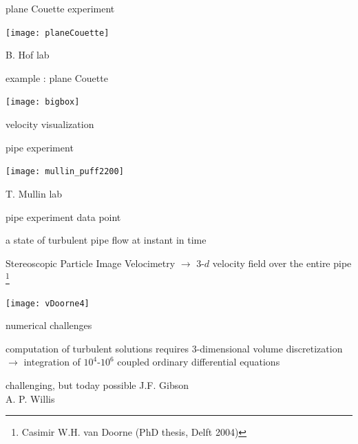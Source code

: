 \begin{frame}{plane Couette experiment}
\begin{center}
\texttt{[image: planeCouette]}
\end{center}
B. Hof lab
\end{frame}

\begin{frame}{example : plane Couette}
\begin{center}
\texttt{[image: bigbox]}
\end{center}
velocity visualization
\end{frame}

\begin{frame}{pipe experiment}
\begin{center}
\texttt{[image: mullin\_puff2200]} %
\end{center}
T. Mullin lab
\end{frame}

\begin{frame}{pipe experiment data point}
\begin{block}{a state of turbulent pipe flow at instant in time}
\end{block}

\bigskip

Stereoscopic Particle Image Velocimetry $\to$
3-$d$ velocity field over the entire pipe%
\footnote{\footnotesize
Casimir W.H. van Doorne
(PhD thesis, Delft  2004)
}

\bigskip

\begin{center}
\texttt{[image: vDoorne4]}
\end{center}
\end{frame}


\begin{frame}{numerical challenges}
            \begin{block}{computation of turbulent solutions}
requires 3-dimensional volume discretization
\\
$\to$ integration of  $10^4$-$10^6$ coupled ordinary differential equations
            \end{block}

\bigskip

\begin{block}{challenging, but today possible}
J.F. Gibson
\\
A. P. Willis
            \end{block}
\end{frame}

